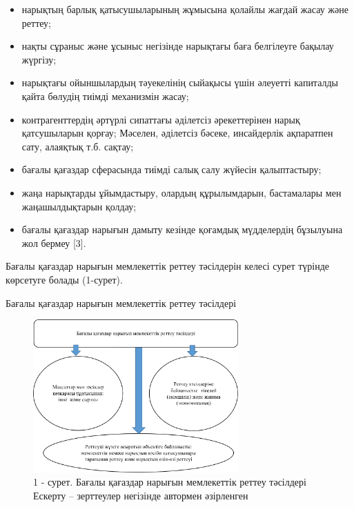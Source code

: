 \begin{multicols}{2}
\begin{itemize}
\item
  нарықтың барлық қатысушыларының жұмысына қолайлы жағдай жасау және
  реттеу;
\item
  нақты сұраныс және ұсыныс негізінде нарықтағы баға белгілеуге бақылау
  жүргізу;
\item
  нарықтағы ойыншылардың тәуекелінің сыйақысы үшін әлеуетті капиталды
  қайта бөлудің тиімді механизмін жасау;
\item
  контрагенттердің әртүрлі сипаттағы әділетсіз әрекеттерінен нарық
  қатсушыларын қорғау; Мәселен, әділетсіз бәсеке, инсайдерлік ақпаратпен
  сату, алаяқтық т.б. сақтау;
\item
  бағалы қағаздар сферасында тиімді салық салу жүйесін қалыптастыру;
\item
  жаңа нарықтарды ұйымдастыру, олардың құрылымдарын, бастамалары мен
  жаңашылдықтарын қолдау;
\item
  бағалы қағаздар нарығын дамыту кезінде қоғамдық мүдделердің бұзылуына
  жол бермеу {[}3{]}.
\end{itemize}

Бағалы қағаздар нарығын мемлекеттік реттеу тәсілдерін келесі сурет
түрінде көрсетуге болады (1-сурет).

Бағалы қағаздар нарығын мемлекеттік реттеу тәсілдері
\end{multicols}

\begin{figure}[H]
	\centering
	\includegraphics[width=0.7\textwidth]{assets/340.1}
	\caption*{1 - сурет. Бағалы қағаздар нарығын мемлекеттік реттеу тәсілдері Ескерту -- зерттеулер негізінде автормен әзірленген}
\end{figure}

